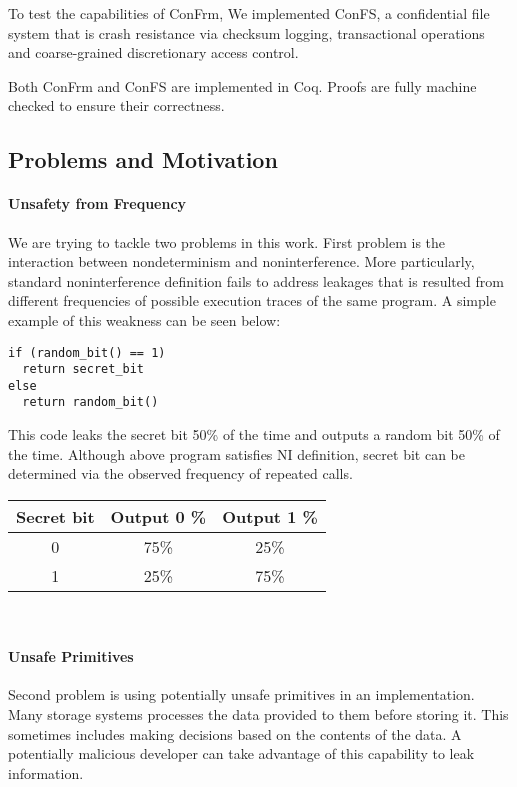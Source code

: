 \documentclass[onecolumn]{paper}
\begin{document}
To test the capabilities of ConFrm, We implemented ConFS, a confidential file system that is crash resistance via checksum logging, transactional operations and coarse-grained discretionary access control.

Both ConFrm and ConFS are implemented in Coq. Proofs are fully machine checked to ensure their correctness.





\subsection*{Problems and Motivation}
\paragraph{Unsafety from Frequency}
We are trying to tackle two problems in this work. First problem is the interaction between nondeterminism and noninterference. More particularly, standard noninterference definition fails to address leakages that is resulted from different frequencies of possible execution traces of the same program. A simple example of this weakness can be seen below:

\begin{lstlisting}
if (random_bit() == 1)
  return secret_bit
else
  return random_bit()
\end{lstlisting}

This code leaks the secret bit 50\% of the time and outputs a random bit 50\% of the time.
Although above program satisfies NI definition, secret bit can be determined via the observed frequency of repeated calls.\\

\begin{tabular}{| c | c | c |}
	\hline
	Secret bit & Output 0 \% & Output 1 \% \\
	\hline
	0 &	75\% & 25\% \\
	\hline
	1 &	25\% & 75\% \\
	\hline
\end{tabular}\\
 
\paragraph{Unsafe Primitives}
Second problem is using potentially unsafe primitives in an implementation. Many storage systems processes the data provided to them before storing it. This sometimes includes making decisions based on the contents of the data. A potentially malicious developer can take advantage of this capability to leak information.
\end{document}
